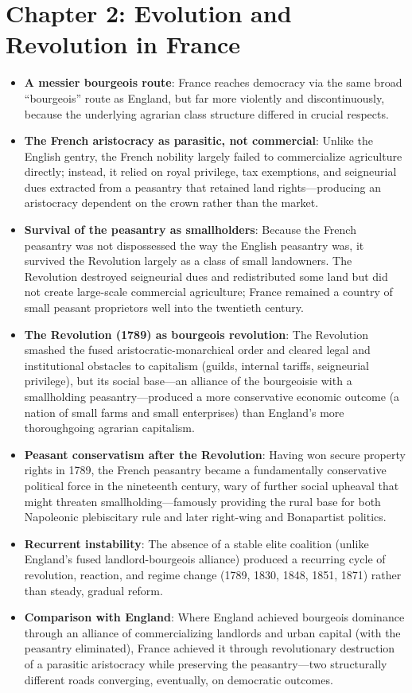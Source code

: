 \documentclass[12pt]{article}
\begin{document}
\section{Chapter 2: Evolution and Revolution in France}

\begin{itemize}[leftmargin=*, itemsep=4pt]
    \item \textbf{A messier bourgeois route}: France reaches democracy via the same broad ``bourgeois'' route as England, but far more violently and discontinuously, because the underlying agrarian class structure differed in crucial respects.
    \item \textbf{The French aristocracy as parasitic, not commercial}: Unlike the English gentry, the French nobility largely failed to commercialize agriculture directly; instead, it relied on royal privilege, tax exemptions, and seigneurial dues extracted from a peasantry that retained land rights---producing an aristocracy dependent on the crown rather than the market.
    \item \textbf{Survival of the peasantry as smallholders}: Because the French peasantry was not dispossessed the way the English peasantry was, it survived the Revolution largely as a class of small landowners. The Revolution destroyed seigneurial dues and redistributed some land but did not create large-scale commercial agriculture; France remained a country of small peasant proprietors well into the twentieth century.
    \item \textbf{The Revolution (1789) as bourgeois revolution}: The Revolution smashed the fused aristocratic-monarchical order and cleared legal and institutional obstacles to capitalism (guilds, internal tariffs, seigneurial privilege), but its social base---an alliance of the bourgeoisie with a smallholding peasantry---produced a more conservative economic outcome (a nation of small farms and small enterprises) than England's more thoroughgoing agrarian capitalism.
    \item \textbf{Peasant conservatism after the Revolution}: Having won secure property rights in 1789, the French peasantry became a fundamentally conservative political force in the nineteenth century, wary of further social upheaval that might threaten smallholding---famously providing the rural base for both Napoleonic plebiscitary rule and later right-wing and Bonapartist politics.
    \item \textbf{Recurrent instability}: The absence of a stable elite coalition (unlike England's fused landlord-bourgeois alliance) produced a recurring cycle of revolution, reaction, and regime change (1789, 1830, 1848, 1851, 1871) rather than steady, gradual reform.
    \item \textbf{Comparison with England}: Where England achieved bourgeois dominance through an alliance of commercializing landlords and urban capital (with the peasantry eliminated), France achieved it through revolutionary destruction of a parasitic aristocracy while preserving the peasantry---two structurally different roads converging, eventually, on democratic outcomes.
\end{itemize}
\end{document}
